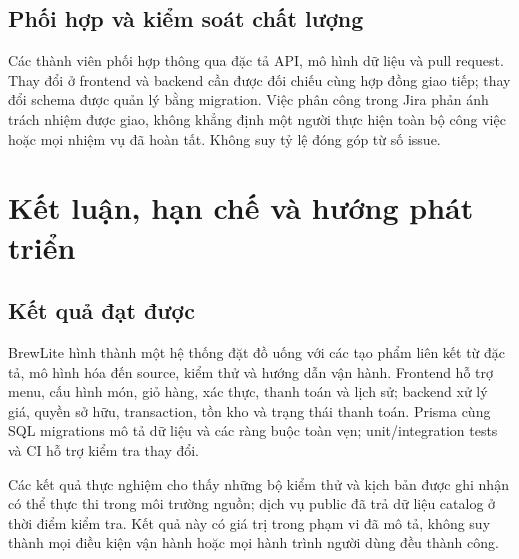\subsection{Phối hợp và kiểm soát chất lượng}
Các thành viên phối hợp thông qua đặc tả API, mô hình dữ liệu và pull request.
Thay đổi ở frontend và backend cần được đối chiếu cùng hợp đồng giao tiếp;
thay đổi schema được quản lý bằng migration. Việc phân công trong Jira phản
ánh trách nhiệm được giao, không khẳng định một người thực hiện toàn bộ
công việc hoặc mọi nhiệm vụ đã hoàn tất. Không suy tỷ lệ đóng góp từ số issue.

\section{Kết luận, hạn chế và hướng phát triển}
\label{sec:evaluation}
\subsection{Kết quả đạt được}
BrewLite hình thành một hệ thống đặt đồ uống với các tạo phẩm liên kết từ
đặc tả, mô hình hóa đến source, kiểm thử và hướng dẫn vận hành. Frontend hỗ trợ
menu, cấu hình món, giỏ hàng, xác thực, thanh toán và lịch sử; backend xử lý
giá, quyền sở hữu, transaction, tồn kho và trạng thái thanh toán. Prisma cùng
SQL migrations mô tả dữ liệu và các ràng buộc toàn vẹn; unit/integration tests
và CI hỗ trợ kiểm tra thay đổi.

Các kết quả thực nghiệm cho thấy những bộ kiểm thử và kịch bản được ghi nhận
có thể thực thi trong môi trường nguồn; dịch vụ public đã trả dữ liệu catalog
ở thời điểm kiểm tra. Kết quả này có giá trị trong phạm vi đã mô tả, không
suy thành mọi điều kiện vận hành hoặc mọi hành trình người dùng đều thành công.

